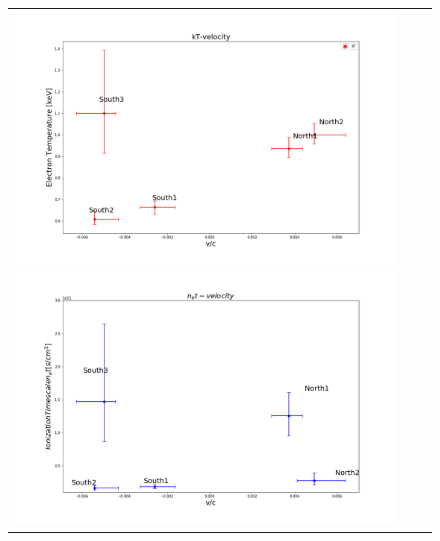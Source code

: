 \documentclass[a4j]{jarticle}%
\begin{document}
\begin{figure}[H]
\begin{center}
\begin{tabular}{ccc}
  
\begin{minipage}{0.5\hsize}
\begin{center}
\includegraphics[scale=0.23]{./vel_vs_kT.png}
\end{center}
\end{minipage}

\begin{minipage}{0.5\hsize}
\begin{center}
\includegraphics[scale=0.23]{./vel_vs_nt.png}
\end{center}
\end{minipage}
\end{tabular}
\caption{}
\label{fig:plasma_vel_corr}
\end{center}
\end{figure}
\end{document}
